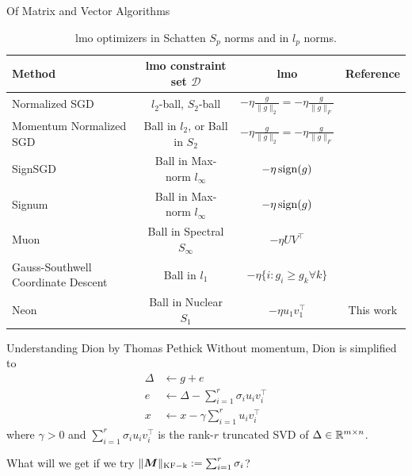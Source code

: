 \documentclass[aspectratio=169]{beamer}
\newcommand{\norm}[1]{\lVert #1\rVert}
\newcommand{\Rmn}{\R^{m\times n}}
\DeclarePairedDelimiter{\normkfk}{\|}{\|_\mathrm{KF-k}}
\begin{document}
\begin{frame}{Of Matrix and Vector Algorithms}
    \footnotesize
    \begin{table}
    \caption{lmo optimizers in Schatten $S_p$ norms and in $l_p$ norms.}
    \label{tbl:mat_vs_vec_lmo}
    \begin{tabularx}{\linewidth}{|>{\raggedright\arraybackslash}X|c|c|c|}
    \hline
    Method & lmo constraint set $\mathcal D$ & lmo & Reference \\
    \hline\hline
    Normalized SGD & $l_2$-ball, $S_2$-ball & $-\eta \tfrac{g}{\norm{g}_2} = -\eta \tfrac{g}{\norm{g}_F}$ & \citep{hazan2015beyond} \\
    Momentum Normalized SGD & Ball in $l_2$, or Ball in $S_2$ & $-\eta \tfrac{g}{\norm{g}_2} = -\eta\tfrac{g}{\norm{g}_F}$ & \citep{cutkosky2020momentum}\\
    \hline
    SignSGD & Ball in Max-norm $l_\infty$ & $-\eta \operatorname{sign}(g)$ & \citep[Thm. 1]{bernstein2018signsgd} \\
    Signum  & Ball in Max-norm $l_\infty$ & $-\eta \operatorname{sign}(g)$ & \citep[Thm. 3]{bernstein2018signsgd} \\
    \hdashline
    Muon & Ball in Spectral $S_\infty$ & $-\eta UV^\top$ & \citep{jordan2024muon} \\
    \hline
    Gauss-Southwell Coordinate Descent & Ball in $l_1$ & $-\eta \{i: g_i \geq g_k \forall k\}$ & \citep[p.19]{shi2016primer}\\
    \hdashline 
    Neon & Ball in Nuclear $S_1$ & $-\eta u_1 v_1^\top$ & This work\\
    \hline
    \end{tabularx}
    \end{table}
\end{frame}
\begin{frame}{Understanding Dion by Thomas Pethick}
    Without momentum, Dion is simplified to
    $$
    \begin{aligned}
    \Delta &\leftarrow g + e  \\
    e &\leftarrow \Delta - \sum_{i=1}^r \sigma_i u_i v_i^\top \\
    x &\leftarrow x - \gamma \sum_{i=1}^r u_i v_i^\top
    \end{aligned}
    $$
    where $\gamma > 0$ and $\sum_{i=1}^r \sigma_i u_iv^\top_i$ is the rank-$r$ truncated SVD of $\Delta \in \Rmn$.
    \vspace{0.4em}

    \faQuestionCircle \space What will we get if we try $\normkfk{\mM}:=\sum_{i=1}^r{\sigma_i}$?
    \end{frame}
\end{document}
